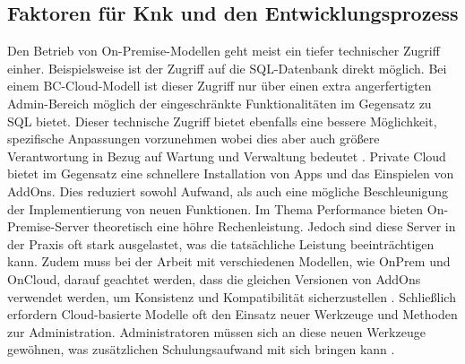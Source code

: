 \documentclass[12pt,bibtotoc]{article}
\begin{document}
			\subsection{Faktoren für Knk und den Entwicklungsprozess}
			Den Betrieb von On-Premise-Modellen geht meist ein tiefer technischer Zugriff einher. Beispielsweise ist der Zugriff auf die SQL-Datenbank direkt möglich. 
			Bei einem BC-Cloud-Modell ist dieser Zugriff nur über einen extra angerfertigten Admin-Bereich möglich der eingeschränkte Funktionalitäten im Gegensatz zu SQL bietet.
			Dieser technische Zugriff bietet ebenfalls eine bessere Möglichkeit, spezifische Anpassungen vorzunehmen wobei dies aber auch größere Verantwortung in Bezug auf Wartung und Verwaltung bedeutet \cite{Anhang}. \newline
			Private Cloud bietet im Gegensatz eine schnellere Installation von Apps und das Einspielen von AddOns. Dies reduziert sowohl Aufwand, als auch eine mögliche Beschleunigung der Implementierung von neuen Funktionen.
			Im Thema Performance bieten On-Premise-Server theoretisch eine höhre Rechenleistung. Jedoch sind diese Server in der Praxis oft stark ausgelastet, was die tatsächliche Leistung beeinträchtigen kann.
			Zudem muss bei der Arbeit mit verschiedenen Modellen, wie OnPrem und OnCloud, darauf geachtet werden, dass die gleichen Versionen von AddOns verwendet werden, um Konsistenz und Kompatibilität sicherzustellen \cite{Anhang}. \newline
			Schließlich erfordern Cloud-basierte Modelle oft den Einsatz neuer Werkzeuge und Methoden zur Administration. Administratoren müssen sich an diese neuen Werkzeuge gewöhnen, was zusätzlichen Schulungsaufwand mit sich bringen kann \cite{Anhang}.
\end{document}
